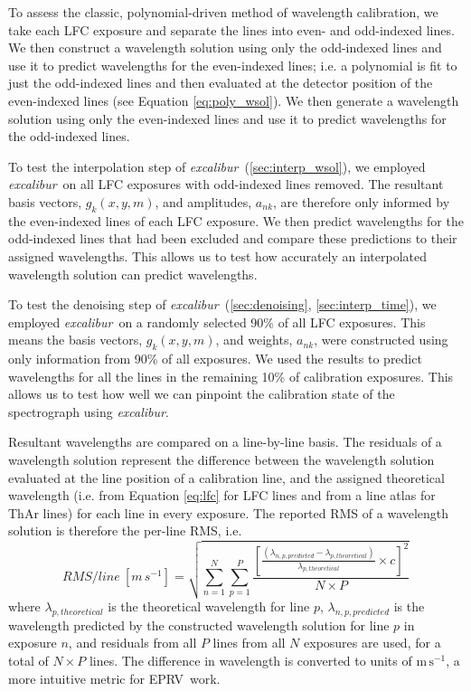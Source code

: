 \documentclass[modern]{aastex63}
\newcommand{\project}[1]{\textsl{#1}}
\newcommand{\name}{\project{excalibur}}
\newcommand{\acronym}[1]{{\small{#1}}}
\newcommand{\eprv}{\acronym{EPRV}}
\newcommand{\mps}{\mathrm{m\,s^{-1}}}
\begin{document}
To assess the classic, polynomial-driven method of wavelength calibration, we take each LFC exposure and separate the lines into even- and odd-indexed lines.  We then construct a wavelength solution using only the odd-indexed lines and use it to predict wavelengths for the even-indexed lines; i.e. a polynomial is fit to just the odd-indexed lines and then evaluated at the detector position of the even-indexed lines (see Equation \ref{eq:poly_wsol}).  We then generate a wavelength solution using only the even-indexed lines and use it to predict wavelengths for the odd-indexed lines.

To test the interpolation step of \name\ (\textsection \ref{sec:interp_wsol}), we employed \name\ on all LFC exposures with odd-indexed lines removed.  The resultant basis vectors, $g_k(x,y,m)$,  and amplitudes, $a_{nk}$, are therefore only informed by the even-indexed lines of each LFC exposure.  We then predict wavelengths for the odd-indexed lines that had been excluded and compare these predictions to their assigned wavelengths.  This allows us to test how accurately an interpolated wavelength solution can predict wavelengths.

To test the denoising step of \name\ (\textsection \ref{sec:denoising}, \textsection\ref{sec:interp_time}), we employed \name\ on a randomly selected 90\% of all LFC exposures.  This means the basis vectors, $g_k(x,y,m)$,  and weights, $a_{nk}$, were constructed using only information from 90\% of all exposures.  We used the results to predict wavelengths for all the lines in the remaining 10\% of calibration exposures.  This allows us to test how well we can pinpoint the calibration state of the spectrograph using \name.

Resultant wavelengths are compared on a line-by-line basis.  The residuals of a wavelength solution represent the difference between the wavelength solution evaluated at the line position of a calibration line, and the assigned theoretical wavelength (i.e. from Equation \ref{eq:lfc} for LFC lines and from a line atlas for ThAr lines) for each line in every exposure.  The reported RMS of a wavelength solution is therefore the per-line RMS, i.e.
\begin{equation}
RMS/line \: [m\,s^{-1}] = \sqrt{\sum_{n=1}^N\sum_{p=1}^P\frac{[ \frac{(\lambda_{n,p,predicted} - \lambda_{p,theoretical})}{\lambda_{p,theoretical}} \times c ]^2}{N \times P}}
\label{eq:rms}
\end{equation}
where $\lambda_{p,theoretical}$ is the theoretical wavelength for line $p$, $\lambda_{n,p,predicted}$ is the wavelength predicted by the constructed wavelength solution for line $p$ in exposure $n$, and residuals from all $P$ lines from all $N$ exposures are used, for a total of $N \times P$ lines.  The difference in wavelength is converted to units of $\mps$, a more intuitive metric for \eprv\ work.
\end{document}
